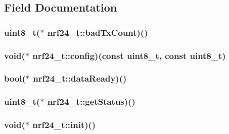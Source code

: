 \subsection{Field Documentation}
\hypertarget{a00007_a920b48080eaef041a9b32b3beae428b5}{
\subsubsection[{bad\-Tx\-Count}]{\setlength{\rightskip}{0pt plus 5cm}uint8\-\_\-t($\ast$ nrf24\-\_\-t\-::bad\-Tx\-Count)()}}\label{a00007_a920b48080eaef041a9b32b3beae428b5}
\hypertarget{a00007_a735fe10ebbd6ad77d4033e79b881aff6}{
\subsubsection[{config}]{\setlength{\rightskip}{0pt plus 5cm}void($\ast$ nrf24\-\_\-t\-::config)(const uint8\-\_\-t, const uint8\-\_\-t)}}\label{a00007_a735fe10ebbd6ad77d4033e79b881aff6}
\hypertarget{a00007_a2becf528ece38156c26fcd1ab20fab17}{
\subsubsection[{data\-Ready}]{\setlength{\rightskip}{0pt plus 5cm}bool($\ast$ nrf24\-\_\-t\-::data\-Ready)()}}\label{a00007_a2becf528ece38156c26fcd1ab20fab17}
\hypertarget{a00007_af429572a8b030785a0419e4cadfaca08}{
\subsubsection[{get\-Status}]{\setlength{\rightskip}{0pt plus 5cm}uint8\-\_\-t($\ast$ nrf24\-\_\-t\-::get\-Status)()}}\label{a00007_af429572a8b030785a0419e4cadfaca08}
\hypertarget{a00007_a79c441ca7795b1ac62a54c192d3da5c6}{
\subsubsection[{init}]{\setlength{\rightskip}{0pt plus 5cm}void($\ast$ nrf24\-\_\-t\-::init)()}}\label{a00007_a79c441ca7795b1ac62a54c192d3da5c6}
